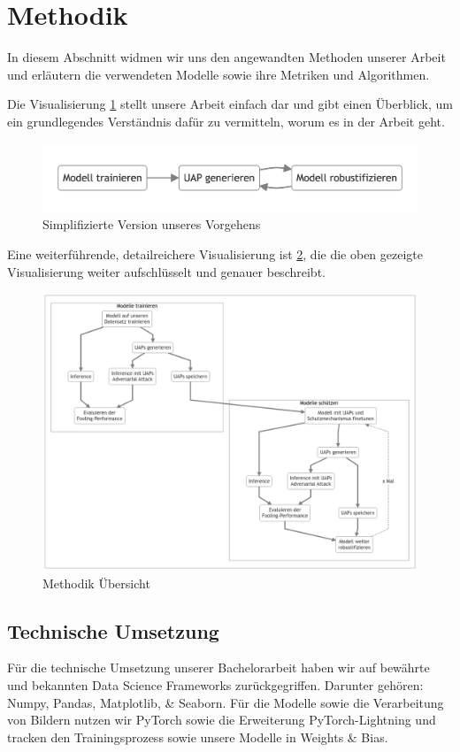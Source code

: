 \section{Methodik} 

In diesem Abschnitt widmen wir uns den angewandten Methoden unserer Arbeit und erläutern die verwendeten Modelle sowie ihre Metriken und Algorithmen.

Die Visualisierung \ref{fig:07-simplified_overview} stellt unsere Arbeit einfach dar und gibt einen Überblick, um ein grundlegendes Verständnis dafür zu vermitteln, worum es in der Arbeit geht.

\begin{figure}[H]
    \centering
    \includegraphics[width=13.5cm]{01-images/04-methodik/simplified_overview.png}
    \caption{Simplifizierte Version unseres Vorgehens}
    \label{fig:07-simplified_overview}
\end{figure}

Eine weiterführende, detailreichere Visualisierung ist \ref{fig:06-overview}, die die oben gezeigte Visualisierung weiter aufschlüsselt und genauer beschreibt.

\begin{figure}[H]
    \centering
    \includegraphics[width=\linewidth]{01-images/04-methodik/overview.png}
    \caption{Methodik Übersicht}
    \label{fig:06-overview}
\end{figure}


\subsection{Technische Umsetzung}

Für die technische Umsetzung unserer Bachelorarbeit haben wir auf bewährte und bekannten Data Science Frameworks zurückgegriffen. Darunter gehören: Numpy, Pandas, Matplotlib, \& Seaborn. Für die Modelle sowie die Verarbeitung von Bildern nutzen wir PyTorch sowie die Erweiterung PyTorch-Lightning und tracken den Trainingsprozess sowie unsere Modelle in Weights \& Bias.
